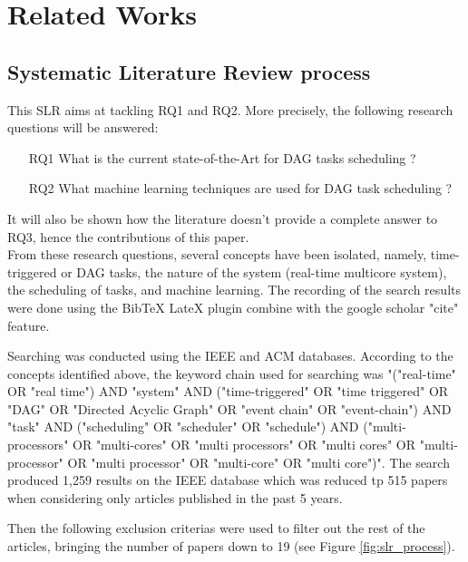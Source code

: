 
\section{Related Works}
\label{sec:literature}

\subsection{Systematic Literature Review process}

This SLR aims at tackling RQ1 and RQ2. More precisely, the following research questions will be answered:

\begin{itemize}
    \item [RQ1] What is the current state-of-the-Art for DAG tasks scheduling ?        
    \item [RQ2] What machine learning  techniques are used for DAG task scheduling ?
\end{itemize}
It will also be shown how the literature doesn't provide 
a complete answer to RQ3, hence the contributions of this paper.\\

From these research questions, several concepts have been isolated,
namely, time-triggered or DAG tasks, the nature of the system (real-time multicore system),
the scheduling of tasks, and machine learning.
The recording of the search results were done using the BibTeX LateX plugin
combine with the google scholar "cite" feature.

Searching was conducted using the IEEE and ACM databases.
According to the concepts identified above, 
the keyword chain used for searching was 
"("real-time" OR "real time") AND 
"system" AND ("time-triggered" OR "time triggered" OR "DAG" OR "Directed Acyclic Graph" OR "event chain" OR "event-chain") 
AND "task" 
AND ("scheduling" OR "scheduler" OR "schedule") 
AND ("multi-processors" OR "multi-cores" OR "multi processors" OR 
"multi cores" OR "multi-processor" OR "multi processor" OR 
"multi-core" OR "multi core")".
The search produced 1,259 results on the IEEE database
which was reduced tp 515 papers when considering only 
articles published in the past 5 years.

Then the following exclusion criterias were used to filter out 
the rest of the articles, bringing the number of papers down to 19
(see Figure \ref{fig:slr_process}).

